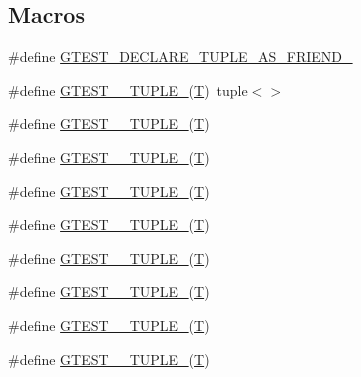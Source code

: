 \subsection*{Macros}
\begin{DoxyCompactItemize}
\item 
\#define \hyperlink{gtest-tuple_8h_a2b20671273f514a88a6e9b8328e5f257}{G\+T\+E\+S\+T\+\_\+\+D\+E\+C\+L\+A\+R\+E\+\_\+\+T\+U\+P\+L\+E\+\_\+\+A\+S\+\_\+\+F\+R\+I\+E\+N\+D\+\_\+}
\item 
\#define \hyperlink{gtest-tuple_8h_acecddf48fa29ec4b0199d5a467e89778}{G\+T\+E\+S\+T\+\_\+\_\+\+T\+U\+P\+L\+E\+\_\+}(\hyperlink{functions__7_8js_adf1f3edb9115acb0a1e04209b7a9937b}{T})~tuple$<$$>$
\item 
\#define \hyperlink{gtest-tuple_8h_a544374090885c4127adc2c618570323c}{G\+T\+E\+S\+T\+\_\+\_\+\+T\+U\+P\+L\+E\+\_\+}(\hyperlink{functions__7_8js_adf1f3edb9115acb0a1e04209b7a9937b}{T})
\item 
\#define \hyperlink{gtest-tuple_8h_a93229c3f009273c73eca237b4d19f326}{G\+T\+E\+S\+T\+\_\+\_\+\+T\+U\+P\+L\+E\+\_\+}(\hyperlink{functions__7_8js_adf1f3edb9115acb0a1e04209b7a9937b}{T})
\item 
\#define \hyperlink{gtest-tuple_8h_af2c3eab3f1a5197b408fce44eb3ed9da}{G\+T\+E\+S\+T\+\_\+\_\+\+T\+U\+P\+L\+E\+\_\+}(\hyperlink{functions__7_8js_adf1f3edb9115acb0a1e04209b7a9937b}{T})
\item 
\#define \hyperlink{gtest-tuple_8h_a3625feb24d5e6eb9926fd558e4a2e3ff}{G\+T\+E\+S\+T\+\_\+\_\+\+T\+U\+P\+L\+E\+\_\+}(\hyperlink{functions__7_8js_adf1f3edb9115acb0a1e04209b7a9937b}{T})
\item 
\#define \hyperlink{gtest-tuple_8h_a64e6f4a4cf55f62cde94066c6d5d5c74}{G\+T\+E\+S\+T\+\_\+\_\+\+T\+U\+P\+L\+E\+\_\+}(\hyperlink{functions__7_8js_adf1f3edb9115acb0a1e04209b7a9937b}{T})
\item 
\#define \hyperlink{gtest-tuple_8h_a53f36c86a979ed8285bf3c6f82f16483}{G\+T\+E\+S\+T\+\_\+\_\+\+T\+U\+P\+L\+E\+\_\+}(\hyperlink{functions__7_8js_adf1f3edb9115acb0a1e04209b7a9937b}{T})
\item 
\#define \hyperlink{gtest-tuple_8h_a8987baf82ee028d1d778447413a02c0c}{G\+T\+E\+S\+T\+\_\+\_\+\+T\+U\+P\+L\+E\+\_\+}(\hyperlink{functions__7_8js_adf1f3edb9115acb0a1e04209b7a9937b}{T})
\item 
\#define \hyperlink{gtest-tuple_8h_a2bc36d1a71a551e6cda2ac5504fb7ce3}{G\+T\+E\+S\+T\+\_\+\_\+\+T\+U\+P\+L\+E\+\_\+}(\hyperlink{functions__7_8js_adf1f3edb9115acb0a1e04209b7a9937b}{T})
\item 
$$
\end{DoxyCompactItemize}
